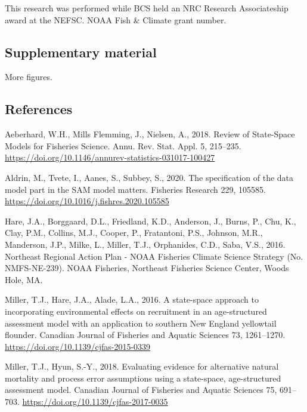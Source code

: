 \documentclass[]{article}
\begin{document}
This research was performed while BCS held an NRC Research Associateship
award at the NEFSC. NOAA Fish \& Climate grant number.

\pagebreak

\hypertarget{supplementary-material}{%
\subsection*{Supplementary material}\label{supplementary-material}}

More figures.

\pagebreak

\hypertarget{references}{%
\subsection*{References}\label{references}}

\hypertarget{refs}{}
\leavevmode\hypertarget{ref-aeberhard2018Review}{}%
Aeberhard, W.H., Mills Flemming, J., Nielsen, A., 2018. Review of
State-Space Models for Fisheries Science. Annu. Rev. Stat. Appl. 5,
215--235. \url{https://doi.org/10.1146/annurev-statistics-031017-100427}

\leavevmode\hypertarget{ref-aldrin2020Specification}{}%
Aldrin, M., Tvete, I., Aanes, S., Subbey, S., 2020. The specification of
the data model part in the SAM model matters. Fisheries Research 229,
105585. \url{https://doi.org/10.1016/j.fishres.2020.105585}

\leavevmode\hypertarget{ref-hare2016Northeast}{}%
Hare, J.A., Borggaard, D.L., Friedland, K.D., Anderson, J., Burns, P.,
Chu, K., Clay, P.M., Collins, M.J., Cooper, P., Fratantoni, P.S.,
Johnson, M.R., Manderson, J.P., Milke, L., Miller, T.J., Orphanides,
C.D., Saba, V.S., 2016. Northeast Regional Action Plan - NOAA Fisheries
Climate Science Strategy (No. NMFS-NE-239). NOAA Fisheries, Northeast
Fisheries Science Center, Woods Hole, MA.

\leavevmode\hypertarget{ref-miller2016Statespace}{}%
Miller, T.J., Hare, J.A., Alade, L.A., 2016. A state-space approach to
incorporating environmental effects on recruitment in an age-structured
assessment model with an application to southern New England yellowtail
flounder. Canadian Journal of Fisheries and Aquatic Sciences 73,
1261--1270. \url{https://doi.org/10.1139/cjfas-2015-0339}

\leavevmode\hypertarget{ref-miller2018Evaluating}{}%
Miller, T.J., Hyun, S.-Y., 2018. Evaluating evidence for alternative
natural mortality and process error assumptions using a state-space,
age-structured assessment model. Canadian Journal of Fisheries and
Aquatic Sciences 75, 691--703.
\url{https://doi.org/10.1139/cjfas-2017-0035}
\end{document}
